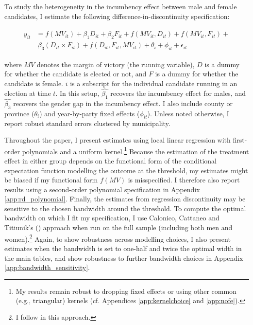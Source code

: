 \documentclass[12pt]{article}
\begin{document}
To study the heterogeneity in the incumbency effect between male and female candidates, I estimate the following difference-in-discontinuity specification:

\begin{align}
\begin{split}
    y_{it} & = f(MV_{it}) + \beta_1 D_{it} + \beta_2 F_{it} + f(MV_{it}, D_{it}) + f(MV_{it}, F_{it}) +  \\
    &  \ \beta_3 (D_{it} \times F_{it}) + f(D_{it}, F_{it}, MV_{it}) + \theta_{i} + \phi_{it} + \epsilon_{it}
\end{split}
\end{align}

\noindent where $MV$ denotes the margin of victory (the running variable), $D$ is a dummy for whether the candidate is elected or not, and $F$ is a dummy for whether the candidate is female. $i$ is a subscript for the individual candidate running in an election at time $t$. In this setup, $\hat{\beta_1}$ recovers the incumbency effect for males, and $\hat{\beta_3}$ recovers the gender gap in the incumbency effect.
I also include county or province ($\theta_i$) and year-by-party fixed effects ($\phi_{it}$). Unless noted otherwise, I report robust standard errors clustered by municipality.

Throughout the paper, I present estimates using local linear regression with first-order polynomials \citep[cf.][]{gelman2018} and a uniform kernel.\footnote{My results remain robust to dropping fixed effects or using other common (e.g., triangular) kernels (cf. Appendices \ref{app:kernelchoice} and \ref{app:nofe}).} Because the estimation of the treatment effect in either group depends on the functional form of the conditional expectation function modelling the outcome at the threshold, my estimates might be biased if my functional form $f(MV)$ is misspecified. I therefore also report results using a second-order polynomial specification in Appendix \ref{app:rd_polynomial}. Finally, the estimates from regression discontinuity may be sensitive to the chosen bandwidth around the threshold. To compute the optimal bandwidth on which I fit my specification, I use Calonico, Cattaneo and Titiunik's (\citeyear{calonico2014}) approach when run on the full sample (including both men and women).\footnote{I follow \citet{cipullo2021} in this approach.} Again, to show robustness across modelling choices, I also present estimates when the bandwidth is set to one-half and twice the optimal width in the main tables, and show robustness to further bandwidth choices in Appendix \ref{app:bandwidth_sensitivity}.
\end{document}
